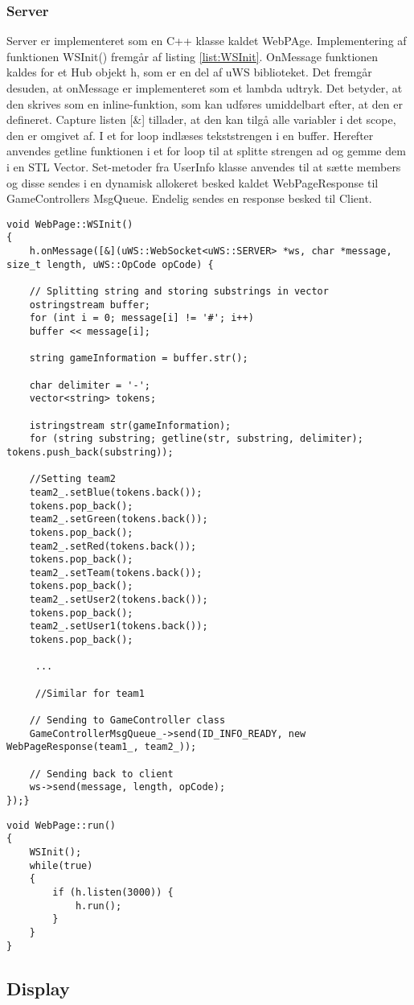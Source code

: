 \documentclass[Softwaredesign/Softwaredesign_main.tex]{subfiles}
\begin{document}
\subsubsection{Server}
Server er implementeret som en C++ klasse kaldet WebPAge. Implementering af funktionen WSInit() fremgår af listing \ref{list:WSInit}. OnMessage funktionen kaldes for et Hub objekt h, som er en del af uWS biblioteket. Det fremgår desuden, at onMessage er implementeret som et lambda udtryk. Det betyder, at den skrives som en inline-funktion, som kan udføres umiddelbart efter, at den er defineret. Capture listen [\&] tillader, at den kan tilgå alle variabler i det scope, den er omgivet af. I et for loop indlæses tekststrengen i en buffer. Herefter anvendes getline funktionen i et for loop til at splitte strengen ad og gemme dem i en STL Vector. Set-metoder fra UserInfo klasse anvendes til at sætte members og disse sendes i en dynamisk allokeret besked kaldet WebPageResponse til GameControllers MsgQueue. Endelig sendes en response besked til Client.
\begin{lstlisting}[caption={Initering af WebSocket}, label=list:WSInit]
void WebPage::WSInit()
{
	h.onMessage([&](uWS::WebSocket<uWS::SERVER> *ws, char *message, size_t length, uWS::OpCode opCode) {

	// Splitting string and storing substrings in vector
	ostringstream buffer;
	for (int i = 0; message[i] != '#'; i++)
	buffer << message[i];

	string gameInformation = buffer.str();

	char delimiter = '-';
	vector<string> tokens;

	istringstream str(gameInformation);
	for (string substring; getline(str, substring, delimiter); tokens.push_back(substring));

	//Setting team2
	team2_.setBlue(tokens.back());
	tokens.pop_back();
	team2_.setGreen(tokens.back());
	tokens.pop_back();
	team2_.setRed(tokens.back());
	tokens.pop_back();
	team2_.setTeam(tokens.back());
	tokens.pop_back();
	team2_.setUser2(tokens.back());
	tokens.pop_back();
	team2_.setUser1(tokens.back());
	tokens.pop_back();

     ...
        
     //Similar for team1
        
	// Sending to GameController class
	GameControllerMsgQueue_->send(ID_INFO_READY, new WebPageResponse(team1_, team2_));

	// Sending back to client
	ws->send(message, length, opCode);
});}
\end{lstlisting}

\begin{lstlisting}[caption={Run() funktion for WebPage}, label=list:webpage_run]
void WebPage::run()
{
	WSInit();
	while(true)
	{
	    if (h.listen(3000)) {
			h.run();
		}
	}
}
\end{lstlisting}



\subsection{Display}
\end{document}
